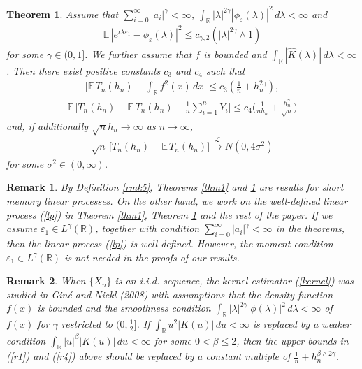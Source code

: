 \documentclass[11pt]{article}
\newtheorem {theorem}{Theorem}[section]
\newtheorem{remark}{Remark}[section]
\def\R{{\mathbb R}}
\def\E{{{\mathbb E}\,}}
\begin{document}
\begin{theorem} \label{thm2} 
Assume that $\sum\limits^{\infty}_{i=0}|a_i|^{\gamma}<\infty$, $\int_{\R}|\lambda|^{2\gamma} |\phi_{\varepsilon}(\lambda)|^2\, d\lambda<\infty$ and 
\begin{align}\label{char2moment}
\E|e^{\iota \lambda \varepsilon_1}-\phi_{\varepsilon}(\lambda)|^{2}\leq c_{\gamma,2} \left(|\lambda|^{2\gamma}\wedge 1\right)
\end{align} 
for some $\gamma\in(0,1]$. We further assume that $f$ is bounded and $\int_{\R} |\widehat{K}(\lambda)|\, d\lambda<\infty$. Then there exist positive constants $c_3$ and $c_4$ such that
\begin{align} \label{r4}
\Big|\E T_n(h_n)-\int_{\R} f^2(x)\, dx \Big|\leq c_3\left(\frac{1}{n}+h^{2\gamma}_n\right),
\end{align}
\begin{align}  \label{r5}
\E\Big|T_n(h_n)-\E T_n(h_n)-\frac{1}{n}\sum^n_{i=1}Y_i\Big| \leq c_4 \Big(\frac{1}{nh_n}+\frac{h^{\gamma}_n}{\sqrt{n}}\Big)
\end{align}
and, if additionally $\sqrt{n}h_n\to\infty$ as $n\to\infty$,
\begin{align} \label{r6}
\sqrt{n}\, \Big[T_n(h_n)-\E T_n(h_n)\Big]\overset{\mathcal{L}}{\longrightarrow} N(0,4\sigma^2)
\end{align}
for some $\sigma^2\in(0,\infty)$.

\end{theorem}

\begin{remark}\label{rmk0}
By Definition \ref{rmk5}, Theorems \ref{thm1} and \ref{thm2} are results for short memory linear processes. On the other hand, we work on the well-defined linear process (\ref{lp}) in Theorem \ref{thm1}, Theorem \ref{thm2} and the rest of the paper. If we assume $\varepsilon_1\in L^\gamma(\mathbb{R})$, together with condition $\sum\limits^{\infty}_{i=0}|a_i|^{\gamma}<\infty$ in the theorems, then the linear process (\ref{lp}) is well-defined. However, the moment condition $\varepsilon_1\in L^\gamma(\R)$ is not needed in the proofs of our results. 
\end{remark}

\begin{remark} \label{rmk1} When $\{X_n\}$ is an i.i.d. sequence, the kernel estimator (\ref{kernel}) was studied in Gin\'{e} and Nickl (2008) with assumptions that  the density function $f(x)$ is bounded and the smoothness condition $\int_{\R}|\lambda|^{2\gamma} |\phi(\lambda)|^2\, d\lambda<\infty$ of $f(x)$ for  $\gamma$ restricted to $(0,\frac{1}{2}]$. If $\int_{\R}u^2|K(u)|\, du<\infty$ is replaced by a weaker condition $\int_{\R} |u|^{\beta}|K(u)|\, du<\infty$ for some $0<\beta\le 2$, then the upper bounds in (\ref{r1}) and (\ref{r4}) above should be replaced by a constant multiple of $\frac{1}{n}+h^{\beta\wedge 2\gamma}_n$. 
\end{remark}
\end{document}
